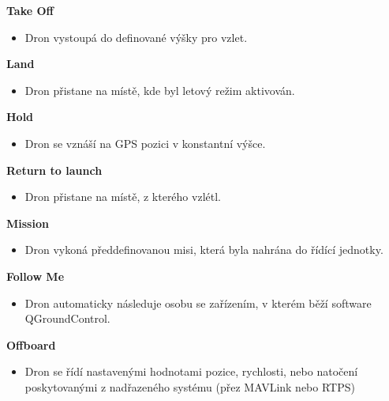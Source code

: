 \noindent\textbf{Take Off}

\begin{itemize}
    \item Dron vystoupá do definované výšky pro vzlet.
\end{itemize}

\noindent\textbf{Land}

\begin{itemize}
    \item Dron přistane na místě, kde byl letový režim aktivován.
\end{itemize}

\noindent\textbf{Hold}

\begin{itemize}
    \item Dron se vznáší na GPS pozici v konstantní výšce.
\end{itemize}

\noindent\textbf{Return to launch}

\begin{itemize}
    \item Dron přistane na místě, z kterého vzlétl.
\end{itemize}

\noindent\textbf{Mission}

\begin{itemize}
    \item Dron vykoná předdefinovanou misi, která byla nahrána do řídící jednotky.
\end{itemize}

\noindent\textbf{Follow Me}

\begin{itemize}
    \item Dron automaticky následuje osobu se zařízením, v kterém běží software QGroundControl.
\end{itemize}

\noindent\textbf{Offboard}

\begin{itemize}
    \item Dron se řídí nastavenými hodnotami pozice, rychlosti, nebo natočení poskytovanými z nadřazeného systému (přez MAVLink nebo \acs{RTPS})
\end{itemize}



